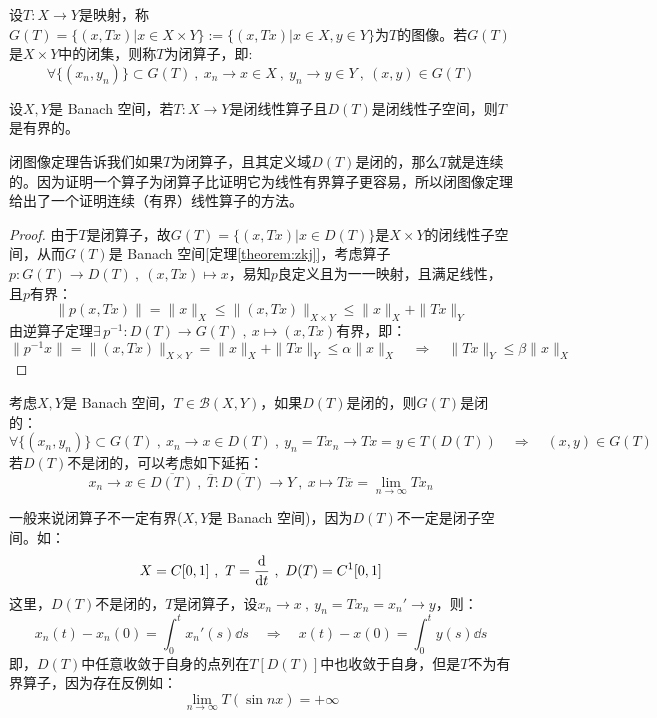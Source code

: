 \begin{definition}[图像，闭图像]\label{definition:bsz}
设$T:X \to Y$是映射，称$G(T)=\{(x,Tx)|x \in X \times Y\}:=\{(x,Tx)|x \in X ,y \in Y\}$为$T$的图像。若$G(T)$是$X \times Y$中的闭集，则称$T$为闭算子，即:
\[\forall \{(x_n,y_n)\} \subset G(T) \ , \ x_n \to x \in X \ , \ y_n \to y \in Y \ , \ (x,y) \in G(T)\]
\end{definition}
\begin{theorem}[闭图像定理]
设$X,Y$是 Banach 空间，若$T:X \to Y$是闭线性算子且$D(T)$是闭线性子空间，则$T$是有界的。
\end{theorem} 
\begin{remark}
\quad 闭图像定理告诉我们如果$T$为闭算子，且其定义域$D(T)$是闭的，那么$T$就是连续的。因为证明一个算子为闭算子比证明它为线性有界算子更容易，所以闭图像定理给出了一个证明连续（有界）线性算子的方法。
\end{remark}
\begin{proof}
由于$T$是闭算子，故$G(T)=\{(x,Tx)|x \in D(T)\}$是$X \times Y$的闭线性子空间，从而$G(T)$是 Banach 空间[定理\ref{theorem:zkj}]，考虑算子$p:G(T) \to D(T) \ , \ (x,Tx) \mapsto x$，易知$p$良定义且为一一映射，且满足线性，且$p$有界：
\[\|p(x,Tx)\|=\|x\|_X \leq \|(x,Tx)\|_{X \times Y} \leq \|x\|_X + \|Tx\|_Y\]
由逆算子定理$\exists \, p^{-1}:D(T) \to G(T) \ , \ x \mapsto (x,Tx)$有界，即：
\[\|p^{-1}x\|=\|(x,Tx)\|_{X \times Y}=\|x\|_X + \|Tx\|_Y \leq \alpha \|x\|_X \quad \Rightarrow \quad \|Tx\|_Y \leq \beta \|x\|_X\]
\end{proof}

\begin{proposition}
考虑$X,Y$是 Banach 空间，$T \in \mathscr{B}(X,Y)$，如果$D(T)$是闭的，则$G(T)$是闭的：
\[\forall\{(x_n,y_n)\} \subset G(T) \ , \ x_n \to x \in D(T) \ , \ y_n=Tx_n \to Tx=y \in T(D(T)) \quad \Rightarrow \quad (x,y) \in G(T)\]
若$D(T)$不是闭的，可以考虑如下延拓：
\[x_n \to x \in \overline{D(T)} \ , \ \overline{T}:\overline{D(T)} \to Y \ , \ x \mapsto T\overline{x}=\lim_{n \to \infty}Tx_n\]
\end{proposition}
\begin{example} \quad 一般来说闭算子不一定有界($X,Y$是 Banach 空间)，因为$D(T)$不一定是闭子空间。如：
\[X=C[0,1] \ , \ T=\dv{t} \ , \ D(T)=C^1[0,1]\]
这里，$D(T)$不是闭的，$T$是闭算子，设$x_n \to x \ , \ y_n=Tx_n=x_n' \to y$，则：
\[x_n(t)-x_n(0)=\int_0^tx_n'(s) \dd s \quad \Rightarrow \quad x(t)-x(0)=\int_0^ty(s) \dd s\]
即，$D(T)$中任意收敛于自身的点列在$T[D(T)]$中也收敛于自身，但是$T$不为有界算子，因为存在反例如：
\[\lim_{n \to \infty}T(\sin nx)=+\infty\]
\end{example}

